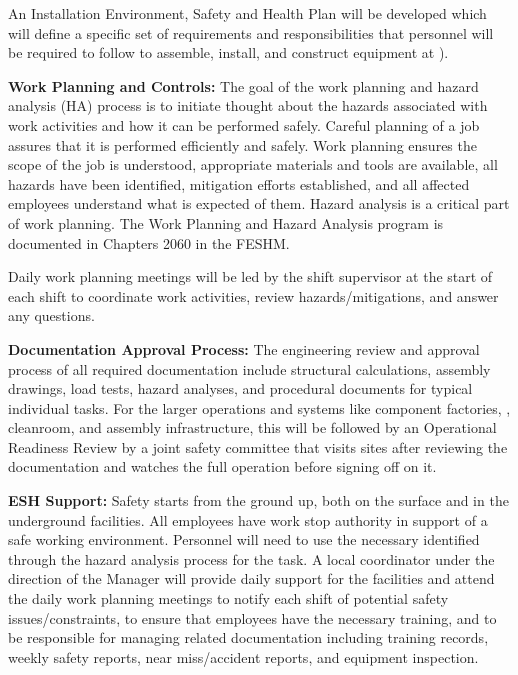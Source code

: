  An Installation Environment, Safety and Health Plan will be developed which will define a specific set of  requirements and responsibilities that personnel will be required to follow to assemble, install, and construct equipment at ). %

{\bf Work Planning and Controls:} The goal of the work planning and hazard analysis (HA) process is to initiate thought about the hazards associated with work activities and how it can be performed safely. Careful planning of a job assures that it is performed efficiently and safely. Work planning ensures the scope of the job is understood, appropriate materials and tools are available, all hazards have been identified, mitigation efforts established, and all affected employees understand what is expected of them. Hazard analysis is a critical part of work planning.  The Work Planning and Hazard Analysis program is documented in Chapters 2060 in the FESHM.

Daily work planning meetings will be led by the shift supervisor at the start of each shift to coordinate work activities, review hazards/mitigations, and answer any questions.

{\bf Documentation Approval Process:} The engineering review and approval process of all required documentation include structural calculations, assembly drawings, load tests, hazard analyses, and procedural documents for typical individual tasks.  For the larger operations and systems like  component factories, , cleanroom, and assembly infrastructure, this will be followed by an Operational Readiness Review by a joint safety committee that visits sites after reviewing the documentation and watches the full operation before signing off on it.

{\bf ESH Support:} Safety starts from the ground up, both on the surface and in the underground facilities. All employees have work stop authority in support of  a safe working environment. Personnel will need to use the necessary  identified through the hazard analysis process for the task. A local  coordinator under the direction of the   Manager will provide daily support for the facilities and attend the daily work planning meetings to notify each shift of potential safety issues/constraints, to ensure that  employees have the necessary  training, and to be responsible for managing  related  documentation including training records, weekly safety reports, near miss/accident reports, and equipment inspection.

